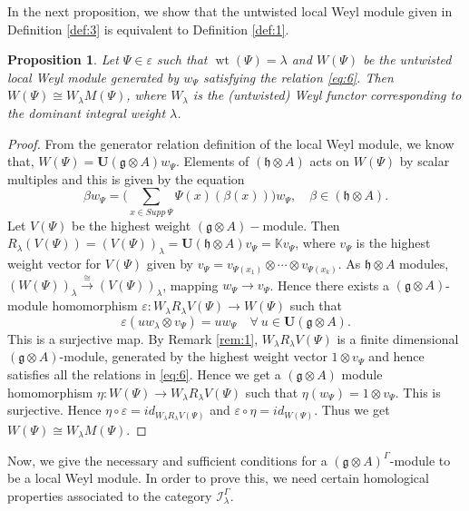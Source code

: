 \documentclass[11pt]{amsart}
\theoremstyle{plain}
\newtheorem{prop}[thm]{Proposition}
\theoremstyle{definition}
\newcommand{\g}{\mathfrak{g}}
\newcommand{\h}{\mathfrak{h}}
\DeclareMathOperator{\wt}{wt}
\begin{document}
In the next proposition, we show that the untwisted local Weyl module given in Definition \ref{def:3} is equivalent to Definition \ref{def:1}. 
 \begin{prop}
Let $\Psi\in\varepsilon$ such that $\wt(\Psi)=\lambda$ and $W(\Psi)$ be the untwisted local Weyl module generated by $w_{\Psi}$ satisfying the relation \eqref{eq:6}. Then $W(\Psi)\cong W_{\lambda}M(\Psi)$, where $W_{\lambda}$ is the (untwisted) Weyl functor corresponding to the dominant integral weight $\lambda$.
\end{prop}
\begin{proof}
From the generator relation definition of the local Weyl module, we know that, $W(\Psi)=\mathbf{U}(\g\otimes A)w_{\Psi}$. Elements of $(\h\otimes A)$ acts on $W(\Psi)$ by scalar multiples and this is given by the equation
    \begin{equation*}
        \beta w_{\Psi}=\biggl(\sum_{x\in Supp\ \Psi}\Psi(x)(\beta(x))\biggl)w_{\Psi}, \quad \beta\in(\h\otimes A).
    \end{equation*}
   Let $V(\Psi)$ be the highest weight $(\g\otimes A)-$module. Then $R_{\lambda}(V(\Psi))=(V(\Psi))_{\lambda}=\mathbf{U}(\h\otimes A)v_{\Psi}=\mathbb{K}v_{\Psi}$, where $v_{\Psi}$ is the highest weight vector for $V(\Psi)$ given by $v_{\Psi}=v_{\Psi(x_{1})}\otimes\cdots\otimes v_{\Psi(x_{k})}$. As $\h\otimes A$ modules, $(W(\Psi))_{\lambda}\xrightarrow{\cong}(V(\Psi))_{\lambda}$, mapping $w_{\Psi}\rightarrow v_{\Psi}$. Hence there exists a $(\g\otimes A)$-module homomorphism $\varepsilon:W_{\lambda}R_{\lambda}V(\Psi)\rightarrow W(\Psi)$ such that 
   \begin{equation*}
       \varepsilon(uw_{\lambda}\otimes v_{\Psi})=uw_{\Psi} \quad \forall~u\in\mathbf{U}(\g\otimes A).
   \end{equation*}
   This is a surjective map.  By Remark \ref{rem:1},  $W_{\lambda}R_{\lambda}V(\Psi)$ is a finite dimensional $(\g\otimes A)$-module, generated by the highest weight vector $1\otimes v_{\Psi}$ and hence satisfies all the relations in \eqref{eq:6}. Hence we get a $(\g\otimes A)$ module homomorphism $\eta:W(\Psi)\rightarrow W_{\lambda}R_{\lambda}V(\Psi)$ such that $\eta(w_{\Psi})=1\otimes v_{\Psi}$. This is surjective. Hence $\eta\circ\varepsilon=id_{W_{\lambda}R_{\lambda}V(\Psi)}$ and $\varepsilon\circ\eta=id_{W(\Psi)} $. Thus we get $W(\Psi)\cong W_{\lambda}M(\Psi)$.
\end{proof}
Now, we give the necessary and sufficient conditions for a $(\g\otimes A)^{\Gamma}$-module to be a local Weyl module. In order to prove this, we need certain homological properties associated to the category $\mathcal{I}_{\lambda}^{\Gamma}$.
\end{document}

